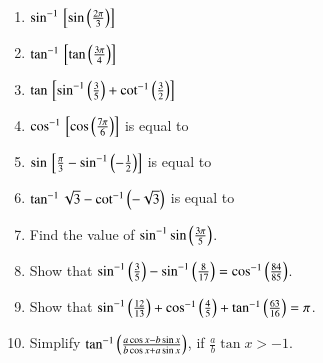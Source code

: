 \begin{enumerate}[label=\thesubsection.\arabic*,ref=\thesubsection.\theenumi,itemsep=1ex]
	\item 
		$\sin^{-1}{}\left[\sin\left(\frac{2\pi}{3}\right)\right]$ 
	\item 
		$\tan^{-1}{}\left[\tan\left(\frac{3\pi}{4}\right)\right]$ 
	\item 
		$\tan{}\left[\sin^{-1}\left(\frac{3}{5}\right)+\cot^{-1}\left(\frac{3}{2}\right)\right]$
	\item 
		$\cos^{-1}{}\left[\cos \left(\frac{7\pi}{6}\right)\right]$ 
		is equal to 
\begin{enumerate}
\end{enumerate}
	\item 
		$\sin{}\left[\frac{\pi}{3}-\sin^{-1}\left(-\frac{1}{2}\right)\right]$ 
		is equal to 
\begin{enumerate}
\end{enumerate}
	\item 
		$\tan^{-1}\sqrt{3}-\cot^{-1}\left(-\sqrt{3}\right)$ 
		is equal to 
\begin{enumerate}
\end{enumerate}
\item Find the value of $\sin ^{-1}\sin\left(\frac{3\pi}{5}\right)$.

\item 	Show that $\sin^{-1}\left(\frac{3}{5}\right)-\sin^{-1}\left(\frac{8}{17}\right)=\cos^{-1}\left(\frac{84}{85}\right)$.
\item 	Show that $\sin^{-1}\left(\frac{12}{13}\right)+\cos^{-1}\left(\frac{4}{5}\right)+\tan^{-1}\left(\frac{63}{16}\right)=\pi$.
	\item Simplify
		$\tan^{-1}\left(\frac{a\cos x-b\sin x}{b\cos x+a\sin x}\right)$, if $
\frac{a}{b}\tan x > -1$.
\end{enumerate}
